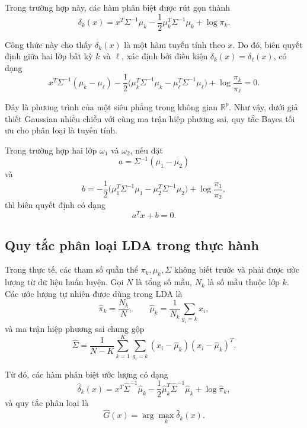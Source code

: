 Trong trường hợp này, các hàm phân biệt được rút gọn thành
\begin{equation}
\delta_k(x)=x^T\Sigma^{-1}\mu_k-\frac12\mu_k^T\Sigma^{-1}\mu_k+\log \pi_k.
\end{equation}

Công thức này cho thấy $\delta_k(x)$ là một hàm tuyến tính theo $x$. Do đó, biên quyết định giữa hai lớp bất kỳ $k$ và $\ell$, xác định bởi điều kiện $\delta_k(x)=\delta_\ell(x)$, có dạng
\begin{equation}
x^T\Sigma^{-1}(\mu_k-\mu_\ell)
-\frac12\bigl(\mu_k^T\Sigma^{-1}\mu_k-\mu_\ell^T\Sigma^{-1}\mu_\ell\bigr)
+\log\frac{\pi_k}{\pi_\ell}=0.
\end{equation}

Đây là phương trình của một siêu phẳng trong không gian $\mathbb{R}^p$. Như vậy, dưới giả thiết Gaussian nhiều chiều với cùng ma trận hiệp phương sai, quy tắc Bayes tối ưu cho phân loại là tuyến tính.

Trong trường hợp hai lớp $\omega_1$ và $\omega_2$, nếu đặt
\begin{equation}
a=\Sigma^{-1}(\mu_1-\mu_2)
\end{equation}
và
\begin{equation}
b=-\frac12\bigl(\mu_1^T\Sigma^{-1}\mu_1-\mu_2^T\Sigma^{-1}\mu_2\bigr)+\log\frac{\pi_1}{\pi_2},
\end{equation}
thì biên quyết định có dạng
\begin{equation}
a^T x+b=0.
\end{equation}

\subsection{Quy tắc phân loại LDA trong thực hành}

Trong thực tế, các tham số quần thể $\pi_k,\mu_k,\Sigma$ không biết trước và phải được ước lượng từ dữ liệu huấn luyện. Gọi $N$ là tổng số mẫu, $N_k$ là số mẫu thuộc lớp $k$. Các ước lượng tự nhiên được dùng trong LDA là
\begin{equation}
\hat \pi_k=\frac{N_k}{N}, \qquad
\hat \mu_k=\frac{1}{N_k}\sum_{g_i=k}x_i,
\end{equation}
và ma trận hiệp phương sai chung gộp
\begin{equation}
\hat \Sigma=
\frac{1}{N-K}
\sum_{k=1}^{K}\sum_{g_i=k}(x_i-\hat\mu_k)(x_i-\hat\mu_k)^T.
\end{equation}

Từ đó, các hàm phân biệt ước lượng có dạng
\begin{equation}
\hat\delta_k(x)=x^T\hat\Sigma^{-1}\hat\mu_k
-\frac12\hat\mu_k^T\hat\Sigma^{-1}\hat\mu_k
+\log\hat\pi_k,
\end{equation}
và quy tắc phân loại là
\begin{equation}
\hat G(x)=\arg\max_k \hat\delta_k(x).
\end{equation}

